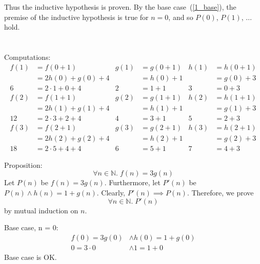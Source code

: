 \documentclass{article}
\begin{document}
Thus the inductive hypothesis is proven. By the base case~(\ref{1_base}), the premise of the inductive hypothesis is true for $n = 0$, and so $P(0)$, $P(1)$, ... hold.

\newpage

\section{}
Computations:
\begin{align*}
f(1) &= f(0+1) &g(1) &= g(0+1) &h(1) &= h(0+1) \\
&= 2h(0) + g(0) + 4 &&= h(0) + 1 &&= g(0) + 3 \\
6&= 2 \cdot 1 + 0 + 4 &2&= 1 + 1 &3&= 0 + 3
\end{align*}
\begin{align*}
f(2) &= f(1+1) &g(2) &= g(1+1) &h(2) &= h(1+1) \\
&= 2h(1) + g(1) + 4 &&= h(1) + 1 &&= g(1) + 3 \\
12&= 2 \cdot 3 + 2 + 4 &4&= 3 + 1 &5&= 2 + 3
\end{align*}
\begin{align*}
f(3) &= f(2+1) &g(3) &= g(2+1) &h(3) &= h(2+1) \\
&= 2h(2) + g(2) + 4 &&= h(2) + 1 &&= g(2) + 3 \\
18&= 2 \cdot 5 + 4 + 4 &6&= 5 + 1 &7&= 4 + 3
\end{align*}

Proposition:
\begin{equation}
\forall n \in \mathbb{N}.\;f(n) = 3g(n)
\end{equation}
Let $P(n)$ be $f(n) = 3g(n)$. Furthermore, let $P'(n)$ be $P(n) \land h(n) = 1 + g(n)$. Clearly, $P'(n) \implies P(n)$. Therefore, we prove
\[\forall n \in \mathbb{N}.\;P'(n)\]
by mutual induction on $n$.

Base case, n = 0:
\begin{align*}
f(0) = 3g(0) &\land h(0) = 1 + g(0) \\
0 = 3\cdot 0 &\land 1 = 1 + 0
\end{align*}
Base case is OK.
\end{document}
